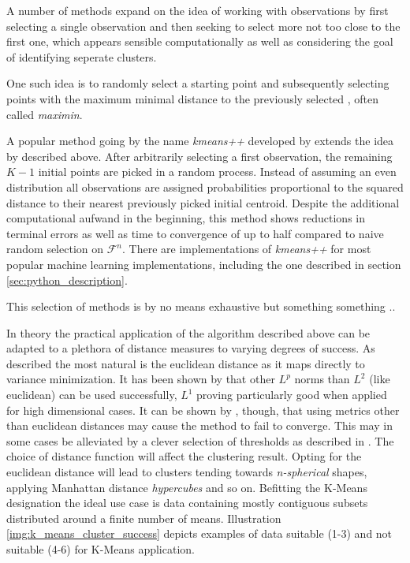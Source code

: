 A number of methods expand on the idea of working with observations by first selecting a single observation and then seeking to select more not too close to the first one, which appears sensible computationally as well as considering the goal of identifying seperate clusters.

One such idea is to randomly select a starting point and subsequently selecting points with the maximum minimal distance to the previously selected \cite{gonzalez1985clustering}, often called \textit{maximin}.

A popular method going by the name \textit{kmeans++} developed by \cite{arthur2006k} extends the idea by \cite{macqueen1967some} described above. After arbitrarily selecting a first observation, the remaining $K-1$ initial points are picked in a random process. Instead of assuming an even distribution all observations are assigned probabilities proportional to the squared distance to their nearest previously picked initial centroid. Despite the additional computational aufwand in the beginning, this method shows reductions in terminal errors as well as time to convergence of up to half compared to naive random selection on $\mathcal{F}^{n}$. There are implementations of \textit{kmeans++} for most popular machine learning implementations, including the one described in section \ref{sec:python_description}.

This selection of methods is by no means exhaustive but something something ..

 In theory the practical application of the algorithm described above can be adapted to a plethora of distance measures to varying degrees of success. As described the most natural is the euclidean distance as it maps directly to variance minimization. It has been shown by \cite{aggarwal2001surprising} that other $L^{p}$ norms than $L^{2}$ (like euclidean) can be used successfully, $L^{1}$ proving particularly good when applied for high dimensional cases. It can be shown by \cite{selim1984k}, though, that using metrics other than euclidean distances may cause the method to fail to converge. This may in some cases be alleviated by a clever selection of thresholds as described in .
The choice of distance function will affect the clustering result. Opting for the euclidean distance will lead to clusters tending towards \textit{n-spherical} shapes, applying Manhattan distance \textit{hypercubes} and so on. Befitting the K-Means designation the ideal use case is data containing mostly contiguous subsets distributed around a finite number of means. Illustration \ref{img:k_means_cluster_success} depicts examples of data suitable (1-3) and not suitable (4-6) for K-Means application.

